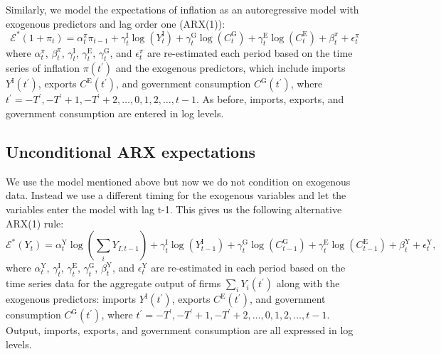 Similarly, we model the expectations of inflation as an autoregressive model with exogenous predictors and lag order one (ARX(1)): 
\begin{equation}
	\mathcal{E}^*(1+\pi_t) = \alpha^{\pi}_{t} \pi_{t-1} + \gamma^{\mathrm{I}}_{t}\log(Y^{\mathrm{I}}_{t}) + \gamma^{\mathrm{G}}_{t}\log(C^{\mathrm{G}}_{t}) + \gamma^{\mathrm{E}}_{t}\log(C^{\mathrm{E}}_{t}) + \beta^{\pi}_{t} + \epsilon^{\pi}_{t}
	\label{eq:inflationarx}
\end{equation}
where \(\alpha^{\pi}_{t}\), \(\beta^{\pi}_{t}\), \(\gamma^{\mathrm{I}}_{t}\), \(\gamma^{\mathrm{E}}_{t}\), \(\gamma^{\mathrm{G}}_{t}\), and \(\epsilon^{\pi}_{t}\) are re-estimated each period based on the time series of inflation \(\pi(t^{\prime})\) and the exogenous predictors, which include imports \(Y^{\mathrm{I}}(t^{\prime})\), exports \(C^{\mathrm{E}}(t^{\prime})\), and government consumption \(C^{\mathrm{G}}(t^{\prime})\), where \(t^{\prime} = -T^{\prime}, -T^{\prime}+1, -T^{\prime}+2, \dots, 0, 1, 2, \dots, t-1\). As before, imports, exports, and government consumption are entered in log levels.

\subsection{Unconditional ARX expectations}
\label{sec:abmunconditional}
We use the model mentioned above but now we do not condition on exogenous data. Instead we use a different timing for the exogenous variables and let the variables enter the model with lag t-1. This gives us the following alternative ARX(1) rule: 
\begin{equation} \label{eq:growtharx}
	\mathcal{E}^*(Y_t) = \alpha^{\mathrm{Y}}_{t} \log \left(\sum_i Y_{I,t-1}\right) + \gamma^{\mathrm{I}}_{t}\log(Y^{\mathrm{I}}_{t-1}) + \gamma^{\mathrm{G}}_{t}\log(C^{\mathrm{G}}_{t-1}) + \gamma^{\mathrm{E}}_{t}\log(C^{\mathrm{E}}_{t-1}) + \beta^{\mathrm{Y}}_{t} + \epsilon^{\mathrm{Y}}_{t},
\end{equation}
where \(\alpha^{\mathrm{Y}}_{t}\), \(\gamma^{\mathrm{I}}_{t}\), \(\gamma^{\mathrm{E}}_{t}\), \(\gamma^{\mathrm{G}}_{t}\), \(\beta^{\mathrm{Y}}_{t}\), and \(\epsilon^{\mathrm{Y}}_{t}\) are re-estimated in each period based on the time series data for the aggregate output of firms \(\sum_i Y_{i}(t^{\prime})\) along with the exogenous predictors: imports \(Y^{\mathrm{I}}(t^{\prime})\), exports \(C^{\mathrm{E}}(t^{\prime})\), and government consumption \(C^{\mathrm{G}}(t^{\prime})\), where \(t^{\prime} = -T^{\prime}, -T^{\prime}+1, -T^{\prime}+2, \ldots, 0, 1, 2, \ldots, t-1\). Output, imports, exports, and government consumption are all expressed in log levels. 


